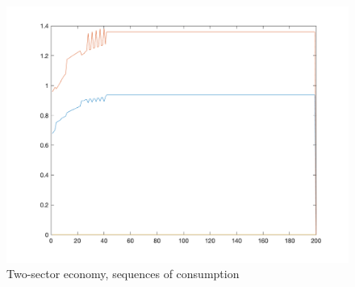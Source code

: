 \documentclass[10pt,letter]{article}
\begin{document}
\begin{figure}
\includegraphics[scale=0.8]{ps3q3_c}
\caption{Two-sector economy, sequences of consumption}
\end{figure}
\end{document}
